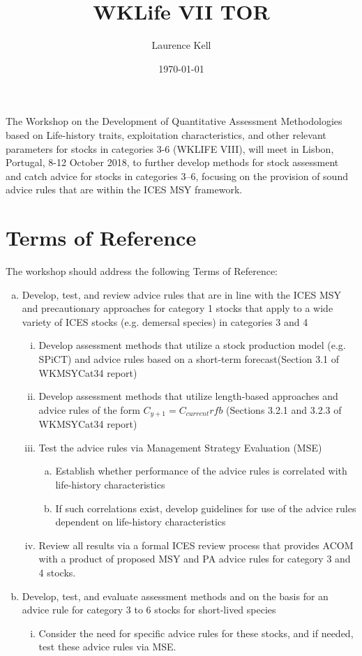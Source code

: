 \documentclass[a4paper,10pt]{article}
\title{WKLife VII TOR}
\author{Laurence Kell}
\date{\today}
\begin{document}
\maketitle

 
The Workshop on the Development of Quantitative Assessment Methodologies based on Life-history traits, exploitation characteristics, and other relevant parameters for stocks in categories 3-6 (WKLIFE VIII), will meet in 
Lisbon, Portugal, 8-12 October 2018, to further develop methods for stock assessment and catch advice for stocks in categories 3–6, focusing on the provision of sound advice rules that are within the ICES MSY framework. 

\section*{Terms of Reference}

The workshop should address the following Terms of Reference:

\begin{enumerate}[a)]
\item Develop, test, and review advice rules that are in line with the ICES MSY and precautionary approaches for category 1 stocks that apply to a wide variety of ICES stocks (e.g. demersal species) in categories 3 and 4
\begin{enumerate}[i)]
 \item Develop assessment methods that utilize a stock production model (e.g. SPiCT) and advice rules based on a short-term forecast(Section 3.1 of WKMSYCat34 report)
 \item Develop assessment methods that utilize length-based approaches and advice rules of the form $C_{y+1} = C_{current}rfb$ (Sections 3.2.1 and 3.2.3 of WKMSYCat34 report) 
 \item Test the advice rules via Management Strategy Evaluation (MSE)
  \begin{enumerate}[a.]
    \item  Establish whether performance of the advice rules is correlated with life-history characteristics
    \item If such correlations exist, develop guidelines for use of the advice rules dependent on life-history characteristics
 \end{enumerate}
 \item Review all results via a formal ICES review process that provides ACOM with a product of proposed MSY and PA advice rules for category 3 and 4 stocks.
\end{enumerate}
\item Develop, test, and evaluate assessment methods and on the basis for an advice rule for category 3 to 6 stocks for short-lived species
\begin{enumerate}[i)]
 \item Consider the need for specific advice rules for these stocks, and if needed, test these advice rules via MSE.
\end{enumerate}
\end{enumerate}
\end{document}
